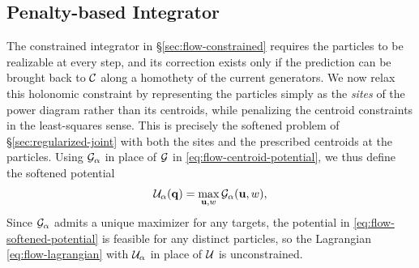 \documentclass[main.tex]{subfiles}
\begin{document}
\subsection{Penalty-based Integrator}
\label{sec:flow-penalty}

The constrained integrator in \S\ref{sec:flow-constrained} requires the particles to be realizable at every step, and its correction exists only if the prediction can be brought back to $\mathcal{C}$ along a homothety of the current generators.
We now relax this holonomic constraint by representing the particles simply as the \emph{sites} of the power diagram rather than its centroids, while penalizing the centroid constraints in the least-squares sense.
This is precisely the softened problem of \S\ref{sec:regularized-joint} with both the sites and the prescribed centroids at the particles. 
Using $\mathcal{G}_\alpha$ in place of $\mathcal{G}$ in \eqref{eq:flow-centroid-potential}, we thus define the softened potential
\begin{equation}
  \mathcal{U}_\alpha(\mathbf{q}) = \max_{\mathbf{u}, w} \mathcal{G}_\alpha(\mathbf{u}, w) ,
  \label{eq:flow-softened-potential}
\end{equation}
Since $\mathcal{G}_\alpha$ admits a unique maximizer for any targets, the potential in \eqref{eq:flow-softened-potential} is feasible for any distinct particles, so the Lagrangian \eqref{eq:flow-lagrangian} with $\mathcal{U}_\alpha$ in place of $\mathcal{U}$ is unconstrained.
\end{document}
